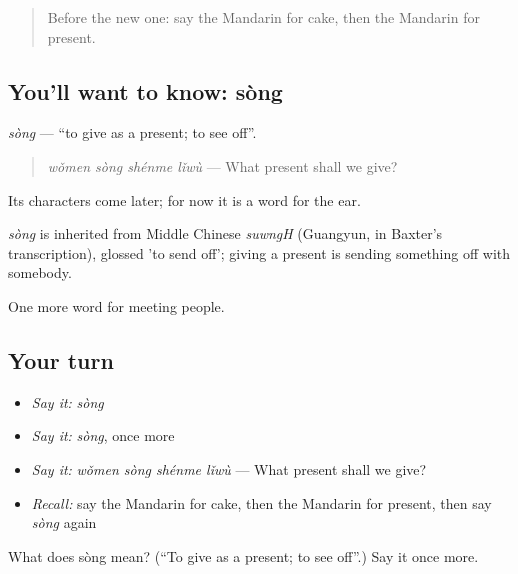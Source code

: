 \begin{quote}
Before the new one: say the Mandarin for cake, then the Mandarin for present.
\end{quote}

\subsection*{You'll want to know: sòng}
\emph{sòng} — \textquotedblleft{}to give as a present; to see off\textquotedblright{}.

\begin{quote}
\emph{wǒmen sòng shénme lǐwù} — What present shall we give?
\end{quote}

Its characters come later; for now it is a word for the ear.

\begin{cousinweb}
\emph{sòng} is inherited from Middle Chinese \emph{suwngH} (Guangyun, in Baxter's transcription), glossed 'to send off'; giving a present is sending something off with somebody.
\end{cousinweb}

\begin{grammarlens}[title={What you've built}]
One more word for meeting people.
\end{grammarlens}

\subsection*{Your turn}
\begin{itemize}
\raggedright
  \item \emph{Say it:} \emph{sòng}
  \item \emph{Say it:} \emph{sòng}, once more
  \item \emph{Say it:} \emph{wǒmen sòng shénme lǐwù} — What present shall we give?
  \item \emph{Recall:} say the Mandarin for cake, then the Mandarin for present, then say \emph{sòng} again
\end{itemize}

\begin{tcolorbox}[breakable,colback=teal!4,colframe=teal!35!black,title={Before you move on}]
What does sòng mean? (\textquotedblleft{}To give as a present; to see off\textquotedblright{}.) Say it once more.
\end{tcolorbox}
